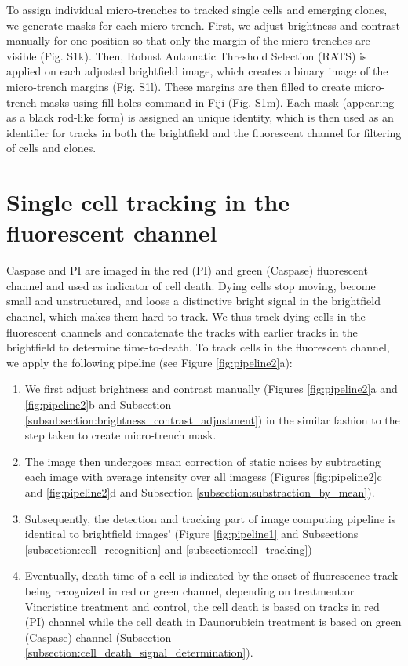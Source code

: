 \documentclass[pdftex,12pt,a4paper]{report}
\begin{document}

To assign individual micro-trenches to tracked single cells and emerging clones, we generate masks for each micro-trench. First, we adjust brightness and contrast manually for one position so that only the margin of the micro-trenches are visible (Fig. S1k). Then, Robust Automatic Threshold Selection (RATS) is applied on each adjusted brightfield image, which creates a binary image of the micro-trench margins (Fig. S1l). These margins are then filled to create micro-trench masks using fill holes command in Fiji (Fig. S1m). Each mask (appearing as a black rod-like form) is assigned an unique identity, which is then used as an identifier for tracks in both the brightfield and the fluorescent channel for filtering of cells and clones.

\section{Single cell tracking in the fluorescent channel}

Caspase and PI are imaged in the red (PI) and green (Caspase) fluorescent channel and used as indicator of cell death. Dying cells stop moving, become small and unstructured, and loose a distinctive bright signal in the brightfield channel, which makes them hard to track. We thus track dying cells in the fluorescent channels and concatenate the tracks with earlier tracks in the brightfield to determine time-to-death. To track cells in the fluorescent channel, we apply the following pipeline (see Figure \ref{fig:pipeline2}a):

\begin{enumerate}
\item We first adjust brightness and contrast manually (Figures \ref{fig:pipeline2}a and \ref{fig:pipeline2}b and Subsection \ref{subsubsection:brightness_contrast_adjustment}) in the similar fashion to the step taken to create micro-trench mask.

\item The image then undergoes mean correction of static noises by subtracting each image with average intensity over all imagess (Figures \ref{fig:pipeline2}c and \ref{fig:pipeline2}d and Subsection \ref{subsection:substraction_by_mean}).

\item Subsequently, the detection and tracking part of image computing pipeline is identical to brightfield images' (Figure \ref{fig:pipeline1} and Subsections \ref{subsection:cell_recognition} and \ref{subsection:cell_tracking})

\item Eventually, death time of a cell is indicated by the onset of fluorescence track being recognized in red or green channel, depending on treatment:or Vincristine treatment and control, the cell death is based on tracks in red (PI) channel while the cell death in Daunorubicin treatment is based on green (Caspase) channel (Subsection \ref{subsection:cell_death_signal_determination}).
\end{enumerate}
\end{document}
